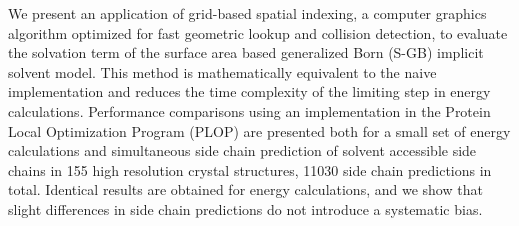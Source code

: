 We present an application of grid-based spatial indexing, a computer graphics algorithm optimized for fast geometric lookup and collision detection, to evaluate the solvation term of the surface area based generalized Born (S-GB) implicit solvent model.
This method is mathematically equivalent to the naive implementation and reduces the time complexity of the limiting step in energy calculations.
Performance comparisons using an implementation in the Protein Local Optimization Program (PLOP) are presented both for a small set of energy calculations and simultaneous side chain prediction of solvent accessible side chains in 155 high resolution crystal structures, 11030 side chain predictions in total.
Identical results are obtained for energy calculations, and we show that slight differences in side chain predictions do not introduce a systematic bias.
